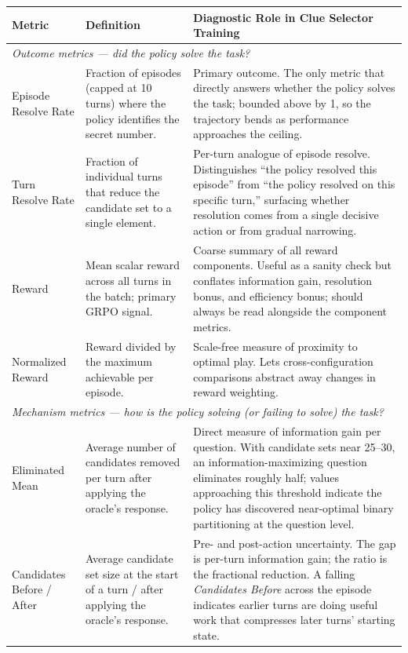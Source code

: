 \documentclass[11pt]{article}
\theoremstyle{plain}
\theoremstyle{definition}
\theoremstyle{remark}
\begin{document}
\begin{table}[t]
\centering
\scriptsize
\setlength{\tabcolsep}{5pt}
\renewcommand{\arraystretch}{1.15}
\begin{tabularx}{\linewidth}{p{3.0cm}p{4.6cm}X}
\toprule
\textbf{Metric} & \textbf{Definition} & \textbf{Diagnostic Role in Clue Selector Training} \\
\midrule
\multicolumn{3}{l}{\textit{Outcome metrics --- did the policy solve the task?}} \\


\midrule
Episode Resolve Rate & Fraction of episodes (capped at 10 turns) where the policy identifies the secret number. & Primary outcome. The only metric that directly answers whether the policy solves the task; bounded above by 1, so the trajectory bends as performance approaches the ceiling. \\
Turn Resolve Rate & Fraction of individual turns that reduce the candidate set to a single element. & Per-turn analogue of episode resolve. Distinguishes ``the policy resolved this episode'' from ``the policy resolved on this specific turn,'' surfacing whether resolution comes from a single decisive action or from gradual narrowing. \\
Reward & Mean scalar reward across all turns in the batch; primary GRPO signal. & Coarse summary of all reward components. Useful as a sanity check but conflates information gain, resolution bonus, and efficiency bonus; should always be read alongside the component metrics. \\
Normalized Reward & Reward divided by the maximum achievable per episode. & Scale-free measure of proximity to optimal play. Lets cross-configuration comparisons abstract away changes in reward weighting. \\
\midrule
\multicolumn{3}{l}{\textit{Mechanism metrics --- how is the policy solving (or failing to solve) the task?}} \\
\midrule
Eliminated Mean & Average number of candidates removed per turn after applying the oracle's response. & Direct measure of information gain per question. With candidate sets near 25--30, an information-maximizing question eliminates roughly half; values approaching this threshold indicate the policy has discovered near-optimal binary partitioning at the question level. \\
Candidates Before / After & Average candidate set size at the start of a turn / after applying the oracle's response. & Pre- and post-action uncertainty. The gap is per-turn information gain; the ratio is the fractional reduction. A falling \emph{Candidates Before} across the episode indicates earlier turns are doing useful work that compresses later turns' starting state. \\

\end{tabularx}
\end{table}
\end{document}
